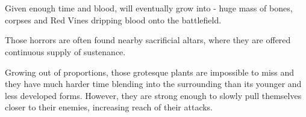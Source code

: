 \section{\enemyVineAbominationName}
\label{enemyVineAbomination}

Given enough time and blood, \enemyVineMonster{} will eventually grow into \enemyVineAbomination{} - huge mass of bones, corpses and Red Vines dripping blood onto the battlefield.

Those horrors are often found nearby sacrificial altars, where they are offered continuous supply of sustenance.

Growing out of proportions, those grotesque plants are impossible to miss and they have much harder time blending into the surrounding than its younger and less developed forms. However, they are strong enough to slowly pull themselves closer to their enemies, increasing reach of their attacks.


\vspace{1cm}
{\hfill {} \hfill}

